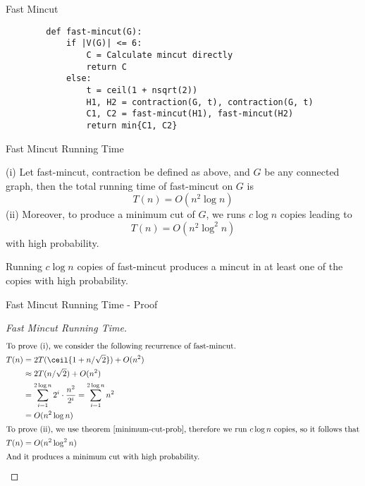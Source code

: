 \begin{frame}[fragile]{Fast Mincut}
    \begin{verbatim}
        def fast-mincut(G):
            if |V(G)| <= 6:
                C = Calculate mincut directly
                return C
            else:
                t = ceil(1 + nsqrt(2))
                H1, H2 = contraction(G, t), contraction(G, t)
                C1, C2 = fast-mincut(H1), fast-mincut(H2)
                return min{C1, C2}
    \end{verbatim}
\end{frame}

\begin{frame}{Fast Mincut Running Time}
    \setlength{\abovedisplayskip}{0pt} 
    \setlength{\belowdisplayskip}{5pt}
    \setlength{\abovedisplayshortskip}{0pt}
    \setlength{\belowdisplayshortskip}{5pt}
    \begin{theorem}
        \label{fast-mincut-running-time}
        (i) Let fast-mincut, contraction be defined as above, and $G$ be any connected graph, then the total running time of fast-mincut on $G$ is
        \[T(n) = O(n^2\log{n})\]
        (ii) Moreover, to produce a minimum cut of $G$, we runs $c\log{n}$ copies leading to
        \[T(n) = O(n^2\log^2{n})\]
        with high probability.
    \end{theorem}
    \begin{theorem}
        \label{minimum-cut-prob}
        Running $c\log{n}$ copies of fast-mincut produces a mincut in at least one of the copies with high probability. 
    \end{theorem}
\end{frame}

\begin{frame}{Fast Mincut Running Time - Proof}
    \setlength{\abovedisplayskip}{2pt}
    \setlength{\belowdisplayskip}{0pt}
    \setlength{\abovedisplayshortskip}{2pt}
    \setlength{\belowdisplayshortskip}{0pt}
    \begin{proof}[Fast Mincut Running Time]
        \begin{align*}
            \intertext{To prove (i), we consider the following recurrence of fast-mincut.}
            T(n) &= 2T(\ceil{1 + n/\sqrt{2}}) + O(n^2) \\
            &\approx 2T(n/\sqrt{2}) + O(n^2)\\
            &= \sum_{i = 1}^{2\log{n}} 2^i \cdot \frac{n^2}{2^i} = \sum_{i = 1}^{2\log{n}} n^2\\
            &= O(n^2\log{n})\\
            \intertext{To prove (ii), we use theorem \ref{minimum-cut-prob}, therefore we run $c\log{n}$ copies, so it follows that}
            T(n) &= O(n^2\log^2{n})\\
            \intertext{And it produces a minimum cut with high probability.}
        \end{align*}
    \end{proof}
\end{frame}

